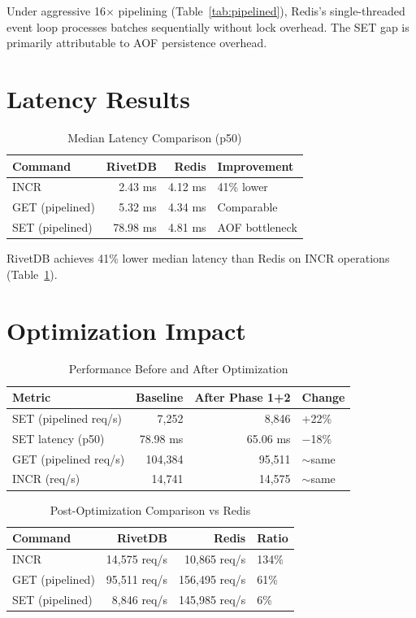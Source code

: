 \documentclass[12pt,a4paper]{report}
\begin{document}
Under aggressive 16$\times$ pipelining (Table~\ref{tab:pipelined}), Redis's single-threaded event loop processes batches sequentially without lock overhead. The SET gap is primarily attributable to AOF persistence overhead.

\section{Latency Results}

\begin{table}[htbp]
\caption{Median Latency Comparison (p50)}
\label{tab:latency}
\centering
\begin{tabular}{@{}lrrl@{}}
\toprule
\textbf{Command} & \textbf{RivetDB} & \textbf{Redis} & \textbf{Improvement} \\
\midrule
INCR & 2.43 ms & 4.12 ms & 41\% lower \\
GET (pipelined) & 5.32 ms & 4.34 ms & Comparable \\
SET (pipelined) & 78.98 ms & 4.81 ms & AOF bottleneck \\
\bottomrule
\end{tabular}
\end{table}

RivetDB achieves 41\% lower median latency than Redis on INCR operations (Table~\ref{tab:latency}).

\section{Optimization Impact}

\begin{table}[htbp]
\caption{Performance Before and After Optimization}
\label{tab:optprogress}
\centering
\begin{tabular}{@{}lrrl@{}}
\toprule
\textbf{Metric} & \textbf{Baseline} & \textbf{After Phase 1+2} & \textbf{Change} \\
\midrule
SET (pipelined req/s) & 7,252 & 8,846 & +22\% \\
SET latency (p50) & 78.98 ms & 65.06 ms & $-$18\% \\
GET (pipelined req/s) & 104,384 & 95,511 & $\sim$same \\
INCR (req/s) & 14,741 & 14,575 & $\sim$same \\
\bottomrule
\end{tabular}
\end{table}

\begin{table}[htbp]
\caption{Post-Optimization Comparison vs Redis}
\label{tab:postopt}
\centering
\begin{tabular}{@{}lrrl@{}}
\toprule
\textbf{Command} & \textbf{RivetDB} & \textbf{Redis} & \textbf{Ratio} \\
\midrule
INCR & 14,575 req/s & 10,865 req/s & 134\% \\
GET (pipelined) & 95,511 req/s & 156,495 req/s & 61\% \\
SET (pipelined) & 8,846 req/s & 145,985 req/s & 6\% \\
\bottomrule
\end{tabular}
\end{table}
\end{document}

